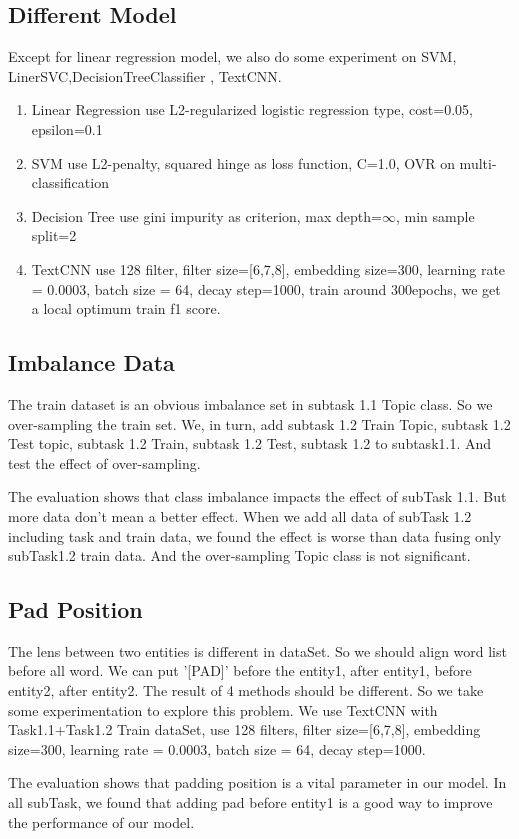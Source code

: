 

\subsection{Different Model}
\label{sec:different_model}

Except for linear regression model, we also do some experiment on SVM, LinerSVC,DecisionTreeClassifier , TextCNN.

\begin{enumerate}
    \item Linear Regression use L2-regularized logistic regression type, cost=0.05, epsilon=0.1
    \item SVM use L2-penalty, squared hinge as loss function, C=1.0, OVR on multi-classification
    \item Decision Tree use gini impurity as criterion, max depth=$\infty$, min sample split=2
    \item TextCNN use 128 filter, filter size=[6,7,8], embedding size=300, learning rate = 0.0003, batch size = 64, decay step=1000, train around 300epochs, we get a local optimum train f1 score.
\end{enumerate}



\subsection{Imbalance Data}
\label{sec:impalance_data}

The train dataset is an obvious imbalance set in subtask 1.1 Topic class. So we over-sampling the train set. We, in turn, add subtask 1.2 Train Topic, subtask 1.2 Test topic, subtask 1.2 Train, subtask 1.2 Test, subtask 1.2 to subtask1.1. And test the effect of over-sampling.



The evaluation shows that class imbalance impacts the effect of subTask 1.1. But more data don't mean a better effect. When we add all data of subTask 1.2 including task and train data, we found the effect is worse than data fusing only subTask1.2 train data. And the over-sampling Topic class is not significant.

\subsection{Pad Position}
\label{sec:pad_position}

The lens between two entities is different in dataSet. So we should align word list before all word. We can put '[PAD]' before the entity1, after entity1, before entity2, after entity2. The result of 4 methods should be different. So we take some experimentation to explore this problem. We use TextCNN with Task1.1+Task1.2 Train dataSet, use 128 filters, filter size=[6,7,8], embedding size=300, learning rate = 0.0003, batch size = 64, decay step=1000.



The evaluation shows that padding position is a vital parameter in our model. In all subTask, we found that adding pad before entity1 is a good way to improve the performance of our model.